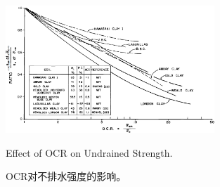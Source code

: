 \begin{figure}[!htb]
    \centering
    \includegraphics[width=0.7\textwidth]{figures/figure-12.png}
    \caption{Effect of OCR on Undrained Strength.}
    \addtocounter{figure}{-1}
    \vspace{-5pt}
    \renewcommand{\figurename}{图}
    \caption{OCR对不排水强度的影响。}
    \renewcommand{\figurename}{Figure}
    \label{figure:12}
\end{figure}